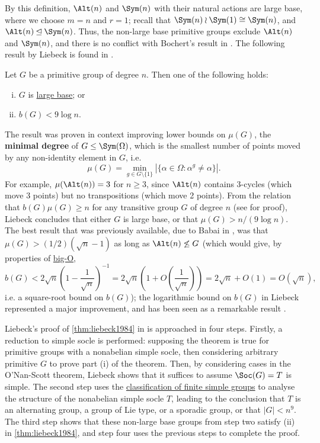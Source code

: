 By this definition, $\Alt(n)$ and $\Sym(n)$ with their natural actions are large base, where we choose $m = n$ and $r = 1$; recall that $\Sym(n) \wr \Sym(1) \cong \Sym(n)$, and $\Alt(n) \unlhd \Sym(n)$. Thus, the non-large base primitive groups exclude $\Alt(n)$ and $\Sym(n)$, and there is no conflict with Bochert's result in \cite{bochert1889}. The following result by Liebeck is found in \cite{liebeck1984}.

\begin{theorem}[Liebeck, 1984]\label{thm:liebeck1984}
    Let $G$ be a primitive group of degree $n$. Then one of the following holds:
    \begin{enumerate}[(i)]
        \item $G$ is \hyperref[def:large_base]{large base}; or
        \item $b(G) < 9\log n$.
    \end{enumerate}
\end{theorem}

The result was proven in context improving lower bounds on $\mu(G)$, the \textbf{minimal degree} of $G \leq \Sym(\Omega)$, which is the smallest number of points moved by any non-identity element in $G$, i.e.
$$\mu(G) = \min_{g \in G \setminus \{1\}}|\{\alpha \in \Omega : \alpha^g \neq \alpha\}|.$$
For example, $\mu(\Alt(n)) = 3$ for $n \geq 3$, since $\Alt(n)$ contains 3-cycles (which move 3 points) but no transpositions (which move 2 points). From the relation that $b(G)\mu(G) \geq n$ for any transitive group $G$ of degree $n$ (see \cite{cameron1984} for proof), Liebeck concludes that either $G$ is large base, or that $\mu(G) > n/(9 \log n)$. The best result that was previously available, due to Babai in \cite{babai1981}, was that $\mu(G) > (1/2)(\sqrt{n} - 1)$ as long as $\Alt(n) \not\leq G$ (which would give, by properties of \hyperref[def:big_O_notation]{big-O},
$$b(G) < 2\sqrt{n}\left(1 - \frac{1}{\sqrt{n}}\right)^{-1} = 2\sqrt{n}\left(1 + O\left(\frac{1}{\sqrt{n}}\right)\right) = 2\sqrt{n} + O(1) = O(\sqrt{n}),$$
i.e. a square-root bound on $b(G)$); the logarithmic bound on $b(G)$ in Liebeck represented a major improvement, and has been seen as a remarkable result \cite{moscatiello_roney-dougal2021}.

Liebeck's proof of \autoref{thm:liebeck1984} in \cite{liebeck1984} is approached in four steps. Firstly, a reduction to simple socle is performed: supposing the theorem is true for primitive groups with a nonabelian simple socle, then considering arbitrary primitive $G$ to prove part (i) of the theorem. Then, by considering cases in the O'Nan-Scott theorem, Liebeck shows that it suffices to assume $\Soc(G) = T$ is simple. The second step uses the \hyperref[thm:cfsg]{classification of finite simple groups} to analyse the structure of the nonabelian simple socle $T$, leading to the conclusion that $T$ is an alternating group, a group of Lie type, or a sporadic group, or that $|G| < n^9$. The third step shows that these non-large base groups from step two satisfy (ii) in \autoref{thm:liebeck1984}, and step four uses the previous steps to complete the proof.

